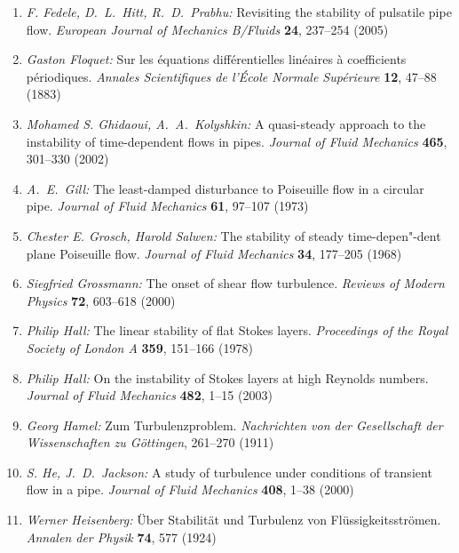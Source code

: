 \documentclass[10pt,a5paper,oneside,draft]{book}
\numberwithin{equation}{chapter}
\begin{document}
\begin{enumerate}
	\item \textsl{F. Fedele, D.~L.~Hitt, R.~D.~Prabhu:} Revisiting the stability of pulsatile pipe flow. \textit{European Journal of Mechanics B/Fluids} \textbf{24}, 237--254 (2005)\bibfill\pageref{bib:fedele_hitt}
	\item \textsl{Gaston Floquet:} Sur les {\'e}quations diff{\'e}rentielles lin{\'e}aires {\`a} coefficients p{\'e}riodiques. \textit{Annales Scientifiques de l'{\'E}cole Normale Sup{\'e}rieure} \textbf{12}, 47--88 (1883)\bibfill\pageref{bib:floquet}
	\item \textsl{Mohamed S. Ghidaoui, A.~A.~Kolyshkin:} A quasi-steady approach to the instability of time-dependent flows in pipes. \textit{Journal of Fluid Mechanics} \textbf{465}, 301--330 (2002)\bibfill\pageref{bib:ghidaoui_kolyshkin}
	\item \textsl{A.~E.~Gill:} The least-damped disturbance to {P}oiseuille flow in a circular pipe. \textit{Journal of Fluid Mechanics} \textbf{61}, 97--107 (1973)\bibfill\pageref{bib:gill2}
	\item \textsl{Chester E. Grosch, Harold Salwen:} The stability of steady time-depen"-dent plane {P}oiseuille flow. \textit{Journal of Fluid Mechanics} \textbf{34}, 177--205 (1968)\bibfill\pageref{bib:grosch_salwen}
	\item \textsl{Siegfried Grossmann:} The onset of shear flow turbulence. \textit{Reviews of Modern Physics} \textbf{72}, 603--618 (2000)\bibfill\pageref{bib:grossmann}
	\item \textsl{Philip Hall:} The linear stability of flat {S}tokes layers. \textit{Proceedings of the Royal Society of London A} \textbf{359}, 151--166 (1978)\bibfill\pageref{bib:hall}
	\item \textsl{Philip Hall:} On the instability of {S}tokes layers at high {R}eynolds numbers. \textit{Journal of Fluid Mechanics} \textbf{482}, 1--15 (2003)\bibfill\pageref{bib:hall3}
	\item \textsl{Georg Hamel:} {Z}um {T}urbulenzproblem. \textit{Nachrichten von der Gesellschaft der Wissenschaften zu G{\"o}ttingen}, 261--270 (1911)\bibfill\pageref{bib:hamel}
	\item \textsl{S. He, J.~D.~Jackson:} A study of turbulence under conditions of transient flow in a pipe. \textit{Journal of Fluid Mechanics} \textbf{408}, 1--38 (2000)\bibfill\pageref{bib:he_jackson}
	\item \textsl{Werner Heisenberg:} {\"U}ber {S}tabilit{\"a}t und {T}urbulenz von {F}l{\"u}ssigkeitsstr{\"o}men. \textit{Annalen der Physik} \textbf{74}, 577 (1924)\bibfill\pageref{bib:heisenberg}

\end{enumerate}
\end{document}
